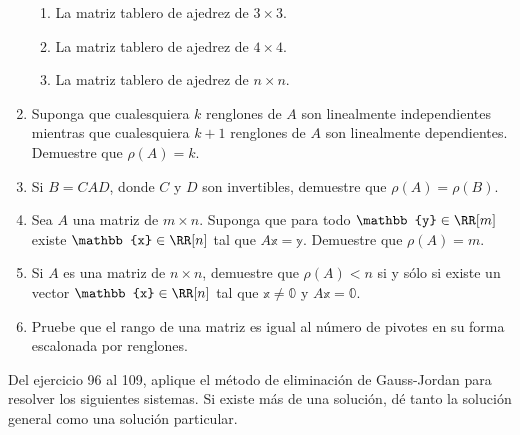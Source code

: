 \begin{enumerate}[start=83]
    \begin{enumerate}
        \item La matriz tablero de ajedrez de $3 \times 3$.
        \item La matriz tablero de ajedrez de $4 \times 4$.
        \item La matriz tablero de ajedrez de $n \times n$.
    \end{enumerate}
    \item Suponga que cualesquiera $k$ renglones de $A$ son linealmente independientes mientras que cualesquiera $k+1$ renglones de $A$ son linealmente dependientes. Demuestre que $\rho(A)=k$.
    \item Si $B=C A D$, donde $C$ y $D$ son invertibles, demuestre que $\rho(A)=\rho(B)$.
    \item Sea $A$ una matriz de $m \times n$. Suponga que para todo $\mathbb{y} \in \RR[m]$ existe $\mathbb{x} \in \RR[n]$ tal que $A \mathbb{x}=\mathbb{y}$. Demuestre que $\rho(A)=m$.
    \item Si $A$ es una matriz de $n \times n$, demuestre que $\rho(A)<n$ si y sólo si existe un vector $\mathbb{x} \in \RR[n]$ tal que $\mathbb{x} \neq \mathbb{0}$ y $A \mathbb{x}=\mathbb{0}$.
    \item Pruebe que el rango de una matriz es igual al número de pivotes en su forma escalonada por renglones.
\end{enumerate}
Del ejercicio 96 al 109, aplique el método de eliminación de Gauss-Jordan para resolver los siguientes sistemas. Si existe más de una solución, dé tanto la solución general como una solución particular.\label{EJERCICIOSDECRAMER}
